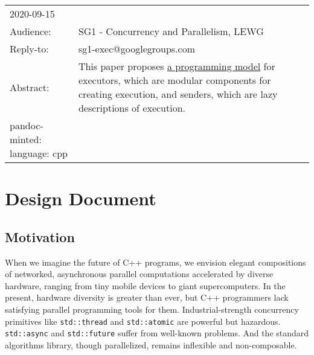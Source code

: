 \documentclass[a4paper,12pt,notitlepage,twoside,openright]{article}
\begin{document}
\begin{longtable}[]{@{}ll@{}}
\begin{minipage}[t]{0.50\columnwidth}
2020-09-15\strut
\end{minipage}\tabularnewline
\begin{minipage}[t]{0.26\columnwidth}\raggedright
Audience:\strut
\end{minipage} & \begin{minipage}[t]{0.50\columnwidth}\raggedright
SG1 - Concurrency and Parallelism, LEWG\strut
\end{minipage}\tabularnewline
\begin{minipage}[t]{0.26\columnwidth}\raggedright
Reply-to:\strut
\end{minipage} & \begin{minipage}[t]{0.50\columnwidth}\raggedright
sg1-exec@googlegroups.com\strut
\end{minipage}\tabularnewline
\begin{minipage}[t]{0.26\columnwidth}\raggedright
Abstract:\strut
\end{minipage} & \begin{minipage}[t]{0.50\columnwidth}\raggedright
This paper proposes \protect\hyperlink{proposed-wording}{a programming
model} for executors, which are modular components for creating
execution, and senders, which are lazy descriptions of execution.\strut
\end{minipage}\tabularnewline
\begin{minipage}[t]{0.26\columnwidth}\raggedright
pandoc-minted: language: cpp\strut
\end{minipage} & \begin{minipage}[t]{0.50\columnwidth}\raggedright
\strut
\end{minipage}\tabularnewline
\bottomrule
\end{longtable}

\hypertarget{design-document}{%
\section{Design Document}\label{design-document}}

\hypertarget{motivation}{%
\subsection{Motivation}\label{motivation}}

When we imagine the future of C++ programs, we envision elegant
compositions of networked, asynchronous parallel computations
accelerated by diverse hardware, ranging from tiny mobile devices to
giant supercomputers. In the present, hardware diversity is greater than
ever, but C++ programmers lack satisfying parallel programming tools for
them. Industrial-strength concurrency primitives like
\texttt{std::thread} and \texttt{std::atomic}
are powerful but hazardous. \texttt{std::async} and
\texttt{std::future} suffer from well-known problems. And
the standard algorithms library, though parallelized, remains inflexible
and non-composable.
\end{document}

